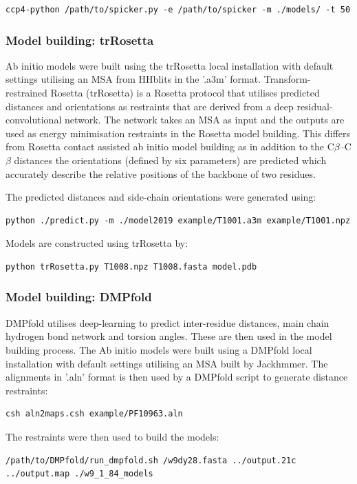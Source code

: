 \begin{lstlisting}[style=linux-terminal]
ccp4-python /path/to/spicker.py -e /path/to/spicker -m ./models/ -t 50 
\end{lstlisting}



\subsubsection{Model building: trRosetta}
Ab initio models were built using the trRosetta \cite{Yang2020} local installation with default settings utilising an MSA from HHblits in the '.a3m' format. Transform-restrained Rosetta (trRosetta) is a Rosetta protocol that utilises predicted distances and orientations as restraints that are derived from a deep residual-convolutional network.  The network takes an MSA as input and the outputs are used as energy minimisation restraints in the Rosetta model building.  This differs from Rosetta contact assisted ab initio model building as in addition to the C$\beta$–C$\beta$ distances the orientations (defined by six parameters) are predicted which accurately describe the relative positions of the backbone of two residues.

The predicted distances and side-chain orientations were generated using:
\begin{lstlisting}[style=linux-terminal]
python ./predict.py -m ./model2019 example/T1001.a3m example/T1001.npz
\end{lstlisting}
Models are constructed using trRosetta by:
\begin{lstlisting}[style=linux-terminal]
python trRosetta.py T1008.npz T1008.fasta model.pdb
\end{lstlisting}

\subsubsection{Model building: DMPfold}
DMPfold \cite{Greener2019} utilises deep-learning to predict inter-residue distances, main chain hydrogen bond network and torsion angles.  These are then used in the model building process. The Ab initio models were built using a DMPfold local installation with default settings utilising an MSA built by Jackhmmer.  The alignments in '.aln' format is then used by a DMPfold script to generate distance restraints: 
\begin{lstlisting}[style=linux-terminal]
csh aln2maps.csh example/PF10963.aln
\end{lstlisting}
The restraints were then used to build the models:
\begin{lstlisting}[style=linux-terminal]
/path/to/DMPfold/run_dmpfold.sh /w9dy28.fasta ../output.21c ../output.map ./w9_1_84_models
\end{lstlisting}

